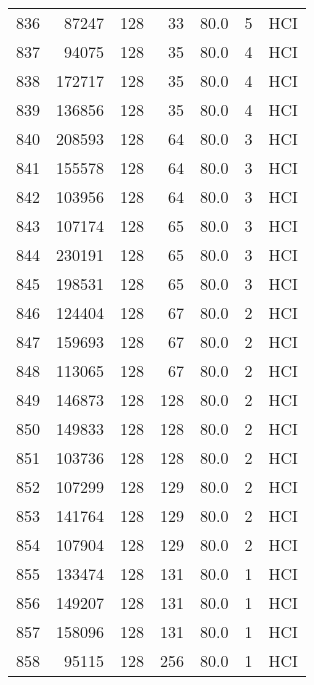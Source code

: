\begin{longtable}{lrrrrrl}
836 &     87247 &        128 &        33 &           80.0 &       5 &  HCI \\
837 &     94075 &        128 &        35 &           80.0 &       4 &  HCI \\
838 &    172717 &        128 &        35 &           80.0 &       4 &  HCI \\
839 &    136856 &        128 &        35 &           80.0 &       4 &  HCI \\
840 &    208593 &        128 &        64 &           80.0 &       3 &  HCI \\
841 &    155578 &        128 &        64 &           80.0 &       3 &  HCI \\
842 &    103956 &        128 &        64 &           80.0 &       3 &  HCI \\
843 &    107174 &        128 &        65 &           80.0 &       3 &  HCI \\
844 &    230191 &        128 &        65 &           80.0 &       3 &  HCI \\
845 &    198531 &        128 &        65 &           80.0 &       3 &  HCI \\
846 &    124404 &        128 &        67 &           80.0 &       2 &  HCI \\
847 &    159693 &        128 &        67 &           80.0 &       2 &  HCI \\
848 &    113065 &        128 &        67 &           80.0 &       2 &  HCI \\
849 &    146873 &        128 &       128 &           80.0 &       2 &  HCI \\
850 &    149833 &        128 &       128 &           80.0 &       2 &  HCI \\
851 &    103736 &        128 &       128 &           80.0 &       2 &  HCI \\
852 &    107299 &        128 &       129 &           80.0 &       2 &  HCI \\
853 &    141764 &        128 &       129 &           80.0 &       2 &  HCI \\
854 &    107904 &        128 &       129 &           80.0 &       2 &  HCI \\
855 &    133474 &        128 &       131 &           80.0 &       1 &  HCI \\
856 &    149207 &        128 &       131 &           80.0 &       1 &  HCI \\
857 &    158096 &        128 &       131 &           80.0 &       1 &  HCI \\
858 &     95115 &        128 &       256 &           80.0 &       1 &  HCI \\

\end{longtable}
